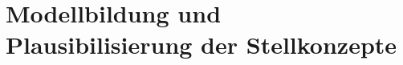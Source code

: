 \section{Modellbildung und Plausibilisierung der Stellkonzepte}
\label{chap:modellbildung_stellkonzepte}